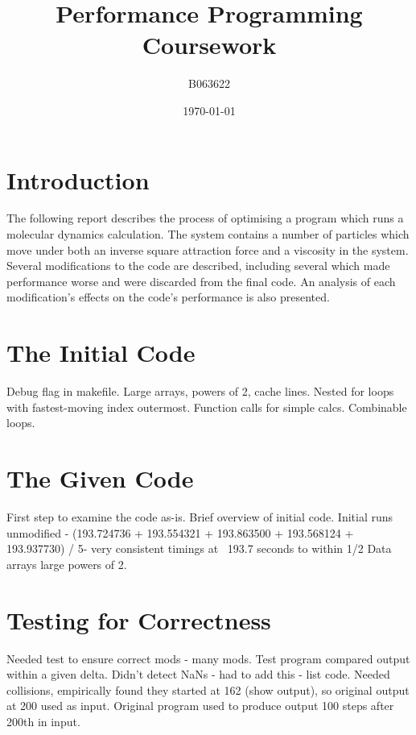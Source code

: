 \documentclass[11pt, oneside]{article}   %
\title{Performance Programming \\ Coursework}
\author{B063622}
\date{\today}
\begin{document}
\maketitle

\newpage

\tableofcontents

\newpage


\section{Introduction}
The following report describes the process of optimising a program which runs a molecular dynamics calculation.
The system contains a number of particles which move under both an inverse square attraction force and a viscosity in the system.
Several modifications to the code are described, including several which made performance worse and were discarded from the final code.
An analysis of each modification's effects on the code's performance is also presented.

\newpage

\section{The Initial Code}
Debug flag in makefile.
Large arrays, powers of 2, cache lines.
Nested for loops with fastest-moving index outermost.
Function calls for simple calcs.
Combinable loops.

\section{The Given Code}
First step to examine the code as-is.
Brief overview of initial code.
Initial runs unmodified - (193.724736 + 193.554321 + 193.863500 + 193.568124 + 193.937730) / 5- very consistent timings at ~193.7 seconds to within 1/2 %
Data arrays large powers of 2.

\section{Testing for Correctness}
Needed test to ensure correct mods - many mods.
Test program compared output within a given delta.
Didn't detect NaNs - had to add this - list code.
Needed collisions, empirically found they started at 162 (show output), so original output at 200 used as input.
Original program used to produce output 100 steps after 200th in input.
\end{document}
